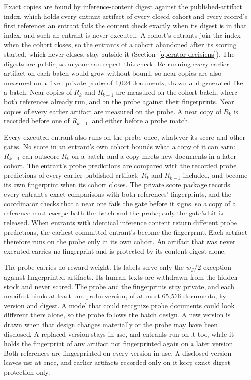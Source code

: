 Exact copies are found by inference-content digest against the
published-artifact index, which holds every entrant artifact of every closed
cohort and every record's first reference: an entrant fails the content check
exactly when its digest is in that index, and such an entrant is never
executed. A cohort's entrants join the index when the cohort closes, so the
entrants of a cohort abandoned after its scoring started, which never closes,
stay outside it (Section~\ref{operator-decisions}). The digests
are public, so anyone can repeat this check. Re-running every
earlier artifact on each batch would grow without bound, so near copies are also
measured on a fixed private probe of 1,024 documents, drawn and generated like a
batch. Near copies of \(R_k\) and \(R_{k-1}\) are measured on the cohort batch,
where both references already run, and on the probe against their
fingerprints. Near copies of every earlier artifact are measured on the probe.
A near copy of \(R_k\) is recorded before one of \(R_{k-1}\), and either before a
probe match.

Every executed entrant also runs on the probe once, whatever its score and other
gates. No score in an entrant's own cohort bounds what a copy of it can earn:
\(R_{k-1}\) can outscore \(R_k\) on a batch, and a copy meets new documents in a
later cohort. The entrant's probe predictions are compared with the recorded
probe predictions of every earlier published artifact, \(R_k\) and \(R_{k-1}\)
included, and become its own fingerprint when its cohort closes. The
private score package records every entrant's exact comparisons with both
references' fingerprints, and the coordinator checks that a near one fails the
gate before it signs, so a copy of a reference must escape both the batch and
the probe; only the gate's bit is released. When entrants with
identical inference content return different probe predictions, the
earliest-committed entrant's become the fingerprint. Each artifact therefore
runs on the probe only in its own cohort. An artifact that was never executed
carries no fingerprint and is protected by its content digest alone.

The probe carries no reward weight. Its labels serve only the \(w_S/2\) exception
against fingerprinted artifacts. Its human texts are withdrawn from the hidden
stock and never scored. The probe and the fingerprints stay private, and each
manifest binds at least one probe version, of at most 65,536 documents, by
version and digest. A model that could recognize probe documents could look
different there alone, so the probe follows the batch design. A new version is
drawn when that design changes materially or the probe may have been disclosed.
A replaced version stays in use, and entrants run on it too, while it holds the
fingerprint of any artifact not fingerprinted again on a later version. Both
references are fingerprinted on every version in use. A disclosed version
leaves use at once, and earlier artifacts recorded only on it keep exact-digest
protection only.

